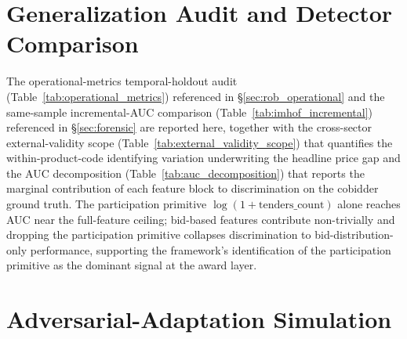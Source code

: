 \begin{table}[htbp]
\centering
\caption{Price Coefficient Across IQR Multiplier Thresholds}
\label{tab:threshold}

\end{table}

\begin{table}[htbp]
\centering
\caption{Alternative Clustering of Standard Errors}
\label{tab:clustering}

\end{table}

\section{Generalization Audit and Detector Comparison}
\label{app:operational}

The operational-metrics temporal-holdout audit
(Table~\ref{tab:operational_metrics}) referenced in
\S\ref{sec:rob_operational} and the same-sample
incremental-AUC comparison
(Table~\ref{tab:imhof_incremental}) referenced in
\S\ref{sec:forensic} are reported here, together with the
cross-sector external-validity scope
(Table~\ref{tab:external_validity_scope}) that quantifies the
within-product-code identifying variation underwriting the
headline price gap and the AUC decomposition
(Table~\ref{tab:auc_decomposition}) that reports the marginal
contribution of each feature block to discrimination on the
cobidder ground truth. The participation primitive
$\log(1+\text{tenders\_count})$ alone reaches AUC near the
full-feature ceiling; bid-based features contribute non-trivially
and dropping the participation primitive collapses discrimination
to bid-distribution-only performance, supporting the framework's
identification of the participation primitive as the dominant
signal at the award layer.









\section{Adversarial-Adaptation Simulation}
\label{app:adversarial}

